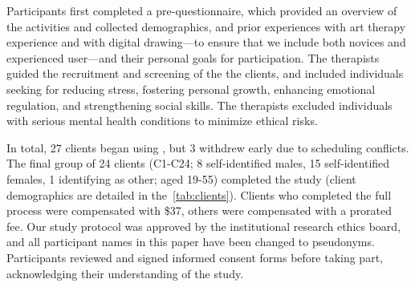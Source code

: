 Participants first completed a pre-questionnaire, which provided an overview of the activities and collected demographics, and prior experiences with art therapy experience and with digital drawing---to ensure that we include both novices and experienced user---and their personal goals for participation. 
The therapists guided the recruitment and screening of the the clients, and included individuals seeking for reducing stress, fostering personal growth, enhancing emotional regulation, and strengthening social skills. The therapists excluded individuals with serious mental health conditions to minimize ethical risks.

In total, 27 clients began using \name{}, but 3 withdrew early due to scheduling conflicts. The final group of 24 clients (C1-C24; 8 self-identified males, 15 self-identified females, 1 identifying as other; aged 19-55) completed the study (client demographics are detailed in the~\autoref{tab:clients}). Clients who completed the full process were compensated with \$37, others were compensated with a prorated fee.
Our study protocol was approved by the institutional research ethics board, and all participant names in this paper have been changed to pseudonyms. Participants reviewed and signed informed consent forms before taking part, acknowledging their understanding of the study.

